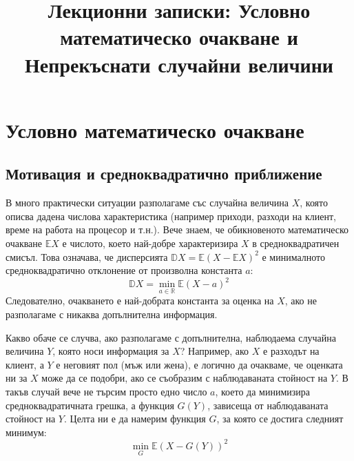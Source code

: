 \documentclass{article}
\title{Лекционни записки: Условно математическо очакване и Непрекъснати случайни величини}
\author{}
\date{}
\begin{document}
\maketitle

\section{Условно математическо очакване}

\subsection{Мотивация и средноквадратично приближение}
В много практически ситуации разполагаме със случайна величина $X$, която описва дадена числова характеристика (например приходи, разходи на клиент, време на работа на процесор и т.н.). Вече знаем, че обикновеното математическо очакване $\mathbb{E}X$ е числото, което най-добре характеризира $X$ в средноквадратичен смисъл. Това означава, че дисперсията $\mathbb{D}X = \mathbb{E}(X - \mathbb{E}X)^2$ е минималното средноквадратично отклонение от произволна константа $a$:
\[
\mathbb{D}X = \min_{a \in \mathbb{R}} \mathbb{E}(X - a)^2
\]
Следователно, очакването е най-добрата константа за оценка на $X$, ако не разполагаме с никаква допълнителна информация. 

Какво обаче се случва, ако разполагаме с допълнителна, наблюдаема случайна величина $Y$, която носи информация за $X$? Например, ако $X$ е разходът на клиент, а $Y$ е неговият пол (мъж или жена), е логично да очакваме, че оценката ни за $X$ може да се подобри, ако се съобразим с наблюдаваната стойност на $Y$. В такъв случай вече не търсим просто едно число $a$, което да минимизира средноквадратичната грешка, а функция $G(Y)$, зависеща от наблюдаваната стойност на $Y$. Целта ни е да намерим функция $G$, за която се достига следният минимум:
\[
\min_{G} \mathbb{E}(X - G(Y))^2
\]
\end{document}
